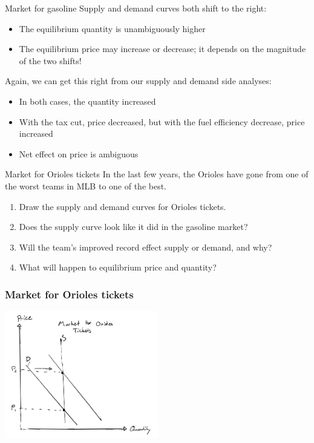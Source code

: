 \documentclass[aspectratio=169]{beamer}
\begin{document}
\begin{frame}{Market for gasoline}
    Supply and demand curves both shift to the right:
    \begin{itemize}
        \item The equilibrium quantity is unambiguously higher
        \item The equilibrium price may increase or decrease; it depends on the magnitude of the two shifts!
    \end{itemize}

    Again, we can get this right from our supply and demand side analyses:
    \begin{itemize}
        \item In both cases, the quantity increased
        \item With the tax cut, price decreased, but with the fuel efficiency decrease, price increased
        \item Net effect on price is ambiguous 
    \end{itemize}

\end{frame}

\begin{frame}{Market for Orioles tickets}
    In the last few years, the Orioles have gone from one of the worst teams in MLB to one of the best.

    \begin{enumerate}
        \item Draw the supply and demand curves for Orioles tickets.
        \item Does the supply curve look like it did in the gasoline market?
        \item Will the team's improved record effect supply or demand, and why?
        \item What will happen to equilibrium price and quantity?
    \end{enumerate}
\end{frame}

\begin{frame}
    \frametitle{Market for Orioles tickets}
    \centering
    \includegraphics[width = 0.5\textwidth,keepaspectratio]{orioles.png}
\end{frame}
\end{document}
